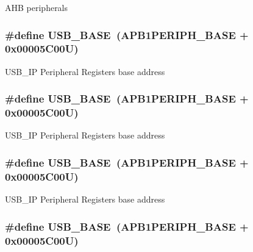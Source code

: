 A\-H\-B peripherals \hypertarget{group___peripheral__memory__map_gaa6c4cbed4ddbb3ecd77de93fab2a2e04}{
\subsubsection[{U\-S\-B\-\_\-\-B\-A\-S\-E}]{\setlength{\rightskip}{0pt plus 5cm}\#define U\-S\-B\-\_\-\-B\-A\-S\-E~(A\-P\-B1\-P\-E\-R\-I\-P\-H\-\_\-\-B\-A\-S\-E + 0x00005\-C00\-U)}}\label{group___peripheral__memory__map_gaa6c4cbed4ddbb3ecd77de93fab2a2e04}
U\-S\-B\-\_\-\-I\-P Peripheral Registers base address \hypertarget{group___peripheral__memory__map_gaa6c4cbed4ddbb3ecd77de93fab2a2e04}{
\subsubsection[{U\-S\-B\-\_\-\-B\-A\-S\-E}]{\setlength{\rightskip}{0pt plus 5cm}\#define U\-S\-B\-\_\-\-B\-A\-S\-E~(A\-P\-B1\-P\-E\-R\-I\-P\-H\-\_\-\-B\-A\-S\-E + 0x00005\-C00\-U)}}\label{group___peripheral__memory__map_gaa6c4cbed4ddbb3ecd77de93fab2a2e04}
U\-S\-B\-\_\-\-I\-P Peripheral Registers base address \hypertarget{group___peripheral__memory__map_gaa6c4cbed4ddbb3ecd77de93fab2a2e04}{
\subsubsection[{U\-S\-B\-\_\-\-B\-A\-S\-E}]{\setlength{\rightskip}{0pt plus 5cm}\#define U\-S\-B\-\_\-\-B\-A\-S\-E~(A\-P\-B1\-P\-E\-R\-I\-P\-H\-\_\-\-B\-A\-S\-E + 0x00005\-C00\-U)}}\label{group___peripheral__memory__map_gaa6c4cbed4ddbb3ecd77de93fab2a2e04}
U\-S\-B\-\_\-\-I\-P Peripheral Registers base address \hypertarget{group___peripheral__memory__map_gaa6c4cbed4ddbb3ecd77de93fab2a2e04}{
\subsubsection[{U\-S\-B\-\_\-\-B\-A\-S\-E}]{\setlength{\rightskip}{0pt plus 5cm}\#define U\-S\-B\-\_\-\-B\-A\-S\-E~(A\-P\-B1\-P\-E\-R\-I\-P\-H\-\_\-\-B\-A\-S\-E + 0x00005\-C00\-U)}}\label{group___peripheral__memory__map_gaa6c4cbed4ddbb3ecd77de93fab2a2e04}
